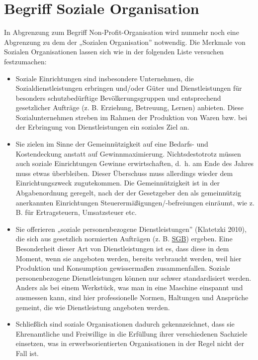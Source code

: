 \documentclass[
  letterpaper,
]{book}
\begin{document}
\chapter{Begriff Soziale
Organisation}\label{begriff-soziale-organisation}

In Abgrenzung zum Begriff Non-Profit-Organisation wird nunmehr noch eine
Abgrenzung zu dem der „Sozialen Organisation'' notwendig. Die Merkmale
von Sozialen Organisationen lassen sich wie in der folgenden Liste
versuchen festzumachen:

\begin{itemize}
\item
  Soziale Einrichtungen sind insbesondere Unternehmen, die
  Sozialdienstleistungen erbringen und/oder Güter und Dienstleistungen
  für besonders schutzbedürftige Bevölkerungsgruppen und entsprechend
  gesetzlicher Aufträge (z. B. Erziehung, Betreuung, Lernen) anbieten.
  Diese Sozialunternehmen streben im Rahmen der Produktion von Waren
  bzw. bei der Erbringung von Dienstleistungen ein soziales Ziel an.
\item
  Sie zielen im Sinne der Gemeinnützigkeit auf eine Bedarfs- und
  Kostendeckung anstatt auf Gewinnmaximierung. Nichtsdestotrotz müssen
  auch soziale Einrichtungen Gewinne erwirtschaften, d.~h. am Ende des
  Jahres muss etwas überbleiben. Dieser Überschuss muss allerdings
  wieder dem Einrichtungszweck zugutekommen. Die Gemeinnützigkeit ist in
  der Abgabenordnung geregelt, nach der der Gesetzgeber den als
  gemeinnützig anerkannten Einrichtungen Steuerermäßigungen/-befreiungen
  einräumt, wie z. B. für Ertragsteuern, Umsatzsteuer etc.
\item
  Sie offerieren „soziale personenbezogene Dienstleistungen'' (Klatetzki
  2010), die sich aus gesetzlich normierten Aufträgen (z. B.
  \href{https://www.bpb.de/kurz-knapp/lexika/politiklexikon/18231/sozialgesetzbuch-sgb/}{SGB})
  ergeben. Eine Besonderheit dieser Art von Dienstleistungen ist es,
  dass diese in dem Moment, wenn sie angeboten werden, bereits
  verbraucht werden, weil hier Produktion und Konsumption gewissermaßen
  zusammenfallen. Soziale personenbezogene Dienstleistungen können nur
  schwer standardisiert werden. Anders als bei einem Werkstück, was man
  in eine Maschine einspannt und ausmessen kann, sind hier
  professionelle Normen, Haltungen und Ansprüche gemeint, die wie
  Dienstleistung angeboten werden.
\item
  Schließlich sind soziale Organisationen dadurch gekennzeichnet, dass
  sie Ehrenamtliche und Freiwillige in die Erfüllung ihrer verschiedenen
  Sachziele einsetzen, was in erwerbsorientierten Organisationen in der
  Regel nicht der Fall ist.
\end{itemize}
\end{document}

